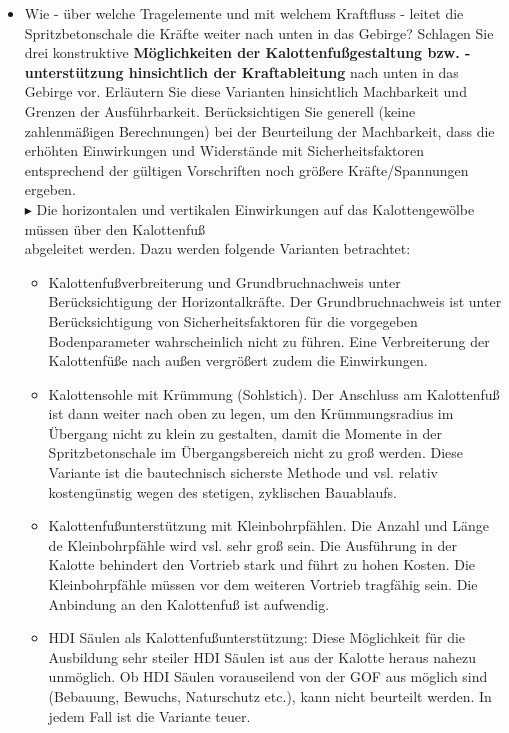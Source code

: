 \documentclass[fleqn,twoside]{article}
\begin{document}
\begin{small}
\begin{itemize}
    \item Wie - über welche Tragelemente und mit welchem Kraftfluss - leitet die Spritzbetonschale die Kräfte weiter nach unten in das Gebirge? Schlagen Sie drei konstruktive \textbf{Möglichkeiten der Kalottenfußgestaltung bzw. -unterstützung hinsichtlich der Kraftableitung} nach unten in das Gebirge vor. Erläutern Sie diese Varianten hinsichtlich Machbarkeit und Grenzen der Ausführbarkeit. Berücksichtigen Sie generell (keine zahlenmäßigen Berechnungen) bei der Beurteilung der Machbarkeit, dass die erhöhten Einwirkungen und Widerstände mit Sicherheitsfaktoren entsprechend der gültigen Vorschriften noch größere Kräfte/Spannungen ergeben.\\
    
    $\blacktriangleright$ Die horizontalen und vertikalen Einwirkungen auf das Kalottengewölbe müssen über den Kalottenfuß\\
    \phantom{$\blacktriangleright$} abgeleitet werden. Dazu werden folgende Varianten betrachtet:
        \begin{itemize}[label={$\blacktriangleright$}]
        \item Kalottenfußverbreiterung und Grundbruchnachweis unter Berücksichtigung der Horizontalkräfte. Der Grundbruchnachweis ist unter Berücksichtigung von Sicherheitsfaktoren für die vorgegeben Bodenparameter wahrscheinlich nicht zu führen. Eine Verbreiterung der Kalottenfüße nach außen vergrößert zudem die Einwirkungen.
        \item Kalottensohle mit Krümmung (Sohlstich). Der Anschluss am Kalottenfuß ist dann weiter nach oben zu legen, um den Krümmungsradius im Übergang nicht zu klein zu gestalten, damit die Momente in der Spritzbetonschale im Übergangsbereich nicht zu groß werden. Diese Variante ist die bautechnisch sicherste Methode und vsl. relativ kostengünstig wegen des stetigen, zyklischen Bauablaufs.
        \item Kalottenfußunterstützung mit Kleinbohrpfählen. Die Anzahl und Länge de Kleinbohrpfähle wird vsl. sehr groß sein. Die Ausführung in der Kalotte behindert den Vortrieb stark und führt zu hohen Kosten. Die Kleinbohrpfähle müssen vor dem weiteren Vortrieb tragfähig sein. Die Anbindung an den Kalottenfuß ist aufwendig.
        \item HDI Säulen als Kalottenfußunterstützung: Diese Möglichkeit für die Ausbildung sehr steiler HDI Säulen ist aus der Kalotte heraus nahezu unmöglich. Ob HDI Säulen vorauseilend von der GOF aus möglich sind (Bebauung, Bewuchs, Naturschutz etc.), kann nicht beurteilt werden. In jedem Fall ist die Variante teuer.

\end{itemize}
\end{itemize}
\end{small}
\end{document}
